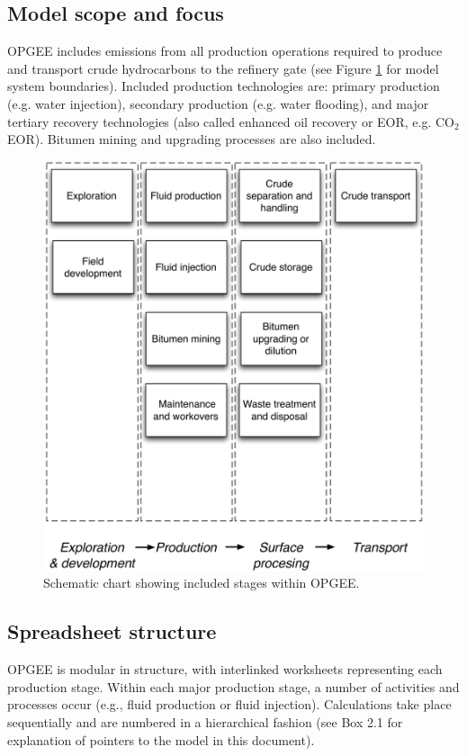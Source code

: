 \documentclass[11pt]{report}
\begin{document}
\subsection{Model scope and focus}

OPGEE includes emissions from all production operations required to produce and transport crude hydrocarbons to the refinery gate (see Figure \ref{fig:OPGEE_stages} for model system boundaries). Included production technologies are: primary production (e.g. water injection), secondary production (e.g. water flooding), and major tertiary recovery technologies (also called enhanced oil recovery or EOR, e.g. CO$_2$ EOR). Bitumen mining and upgrading processes are also included. 

\begin{figure}[t]
\includegraphics[width=0.85\columnwidth]{images/Flow_sheet_v4.pdf}
\caption{Schematic chart showing included stages within OPGEE.}
\label{fig:OPGEE_stages}
\end{figure}


\subsection{Spreadsheet structure}

OPGEE is modular in structure, with interlinked worksheets representing each production stage. Within each major production stage, a number of activities and processes occur (e.g., fluid production or fluid injection). Calculations take place sequentially and are numbered in a hierarchical fashion (see Box 2.1 for explanation of pointers to the model in this document). 
\end{document}
